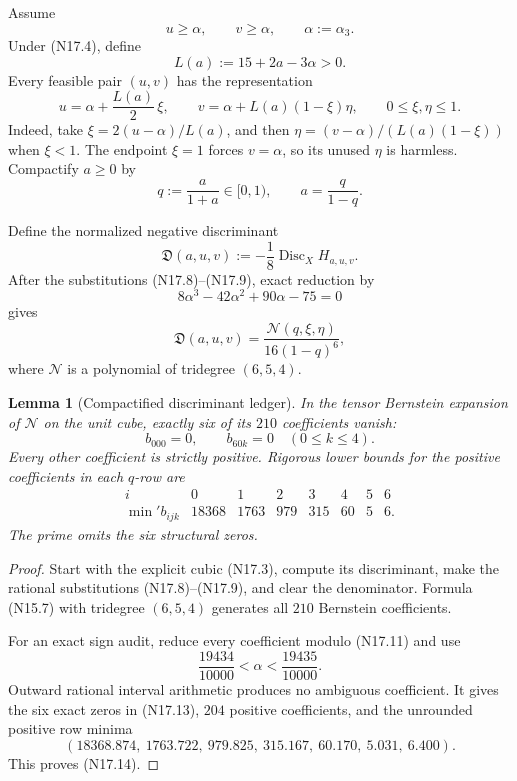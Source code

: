 \documentclass[11pt]{article}
\newtheorem{lemma}[theorem]{Lemma}
\theoremstyle{definition}
\theoremstyle{remark}
\begin{document}
Assume
\[
 u\geq\alpha,\qquad v\geq\alpha,
 \qquad \alpha:=\alpha_3.
 \tag{N17.6}
\]
Under \textup{(N17.4)}, define
\[
 L(a):=15+2a-3\alpha>0.
 \tag{N17.7}
\]
Every feasible pair \((u,v)\) has the representation
\[
 u=\alpha+\frac{L(a)}2\,\xi,
 \qquad
 v=\alpha+L(a)(1-\xi)\eta,
 \qquad 0\leq\xi,\eta\leq1.
 \tag{N17.8}
\]
Indeed, take
\(\xi=2(u-\alpha)/L(a)\), and then
\(\eta=(v-\alpha)/(L(a)(1-\xi))\) when \(\xi<1\).
The endpoint \(\xi=1\) forces \(v=\alpha\), so its unused \(\eta\) is
harmless.  Compactify \(a\geq0\) by
\[
 q:=\frac{a}{1+a}\in[0,1),
 \qquad a=\frac q{1-q}.
 \tag{N17.9}
\]

Define the normalized negative discriminant
\[
 \mathfrak D(a,u,v):=
 -\frac18\operatorname{Disc}_XH_{a,u,v}.
 \tag{N17.10}
\]
After the substitutions \textup{(N17.8)}--\textup{(N17.9)}, exact
reduction by
\[
 8\alpha^3-42\alpha^2+90\alpha-75=0
 \tag{N17.11}
\]
gives
\[
 \mathfrak D(a,u,v)
 =\frac{\mathcal N(q,\xi,\eta)}
        {16(1-q)^6},
 \tag{N17.12}
\]
where \(\mathcal N\) is a polynomial of tridegree \((6,5,4)\).

\begin{lemma}[Compactified discriminant ledger]
\label{lem:f2v17-discriminant-ledger}
In the tensor Bernstein expansion of \(\mathcal N\) on the unit cube,
exactly six of its \(210\) coefficients vanish:
\[
 b_{000}=0,
 \qquad
 b_{60k}=0\quad(0\leq k\leq4).
 \tag{N17.13}
\]
Every other coefficient is strictly positive.  Rigorous lower bounds for
the positive coefficients in each \(q\)-row are
\[
\begin{array}{c|rrrrrrr}
 i&0&1&2&3&4&5&6\\ \hline
 \min{}'b_{ijk}
 &18368&1763&979&315&60&5&6.
\end{array}
\tag{N17.14}
\]
The prime omits the six structural zeros.
\end{lemma}

\begin{proof}
Start with the explicit cubic \textup{(N17.3)}, compute its discriminant,
make the rational substitutions \textup{(N17.8)}--\textup{(N17.9)}, and
clear the denominator.  Formula \textup{(N15.7)} with tridegree
\((6,5,4)\) generates all \(210\) Bernstein coefficients.

For an exact sign audit, reduce every coefficient modulo
\textup{(N17.11)} and use
\[
 \frac{19434}{10000}<\alpha<\frac{19435}{10000}.
 \tag{N17.15}
\]
Outward rational interval arithmetic produces no ambiguous coefficient.
It gives the six exact zeros in \textup{(N17.13)}, \(204\) positive
coefficients, and the unrounded positive row minima
\[
 (18368.874,\ 1763.722,\ 979.825,\ 315.167,\
   60.170,\ 5.031,\ 6.400).
 \tag{N17.16}
\]
This proves \textup{(N17.14)}.
\end{proof}
\end{document}
